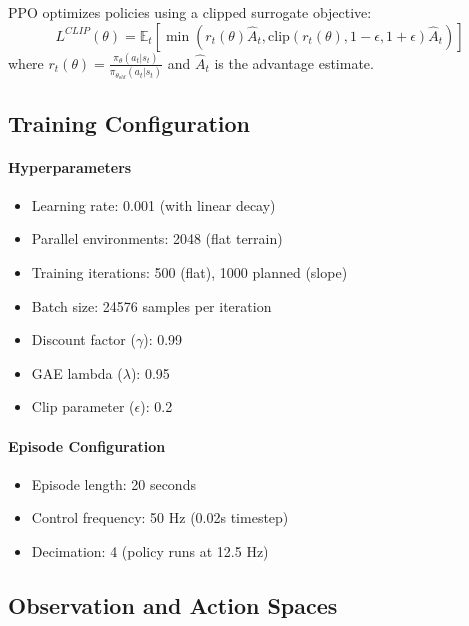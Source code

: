 \documentclass[12pt,a4paper]{article}
\begin{document}
PPO optimizes policies using a clipped surrogate objective:
\begin{equation}
L^{CLIP}(\theta) = \mathbb{E}_t\left[\min\left(r_t(\theta)\hat{A}_t, \text{clip}(r_t(\theta), 1-\epsilon, 1+\epsilon)\hat{A}_t\right)\right]
\end{equation}
where $r_t(\theta) = \frac{\pi_\theta(a_t|s_t)}{\pi_{\theta_{old}}(a_t|s_t)}$ and $\hat{A}_t$ is the advantage estimate.

\subsection{Training Configuration}

\paragraph{Hyperparameters}
\begin{itemize}
    \item Learning rate: 0.001 (with linear decay)
    \item Parallel environments: 2048 (flat terrain)
    \item Training iterations: 500 (flat), 1000 planned (slope)
    \item Batch size: 24576 samples per iteration
    \item Discount factor ($\gamma$): 0.99
    \item GAE lambda ($\lambda$): 0.95
    \item Clip parameter ($\epsilon$): 0.2
\end{itemize}

\paragraph{Episode Configuration}
\begin{itemize}
    \item Episode length: 20 seconds
    \item Control frequency: 50 Hz (0.02s timestep)
    \item Decimation: 4 (policy runs at 12.5 Hz)
\end{itemize}

\subsection{Observation and Action Spaces}
\end{document}
